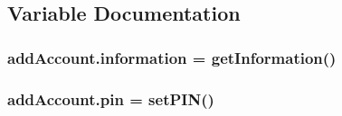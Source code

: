 \subsection{Variable Documentation}
\subsubsection[{\texorpdfstring{information}{information}}]{\setlength{\rightskip}{0pt plus 5cm}add\+Account.\+information = {\bf get\+Information}()}\hypertarget{namespaceaddAccount_a54cf092e8aeaae1cd4b3d502f239ae08}{}\label{namespaceaddAccount_a54cf092e8aeaae1cd4b3d502f239ae08}
\subsubsection[{\texorpdfstring{pin}{pin}}]{\setlength{\rightskip}{0pt plus 5cm}add\+Account.\+pin = {\bf set\+P\+IN}()}\hypertarget{namespaceaddAccount_ae10ea4b40c1517c05f038e86e63fb541}{}\label{namespaceaddAccount_ae10ea4b40c1517c05f038e86e63fb541}
